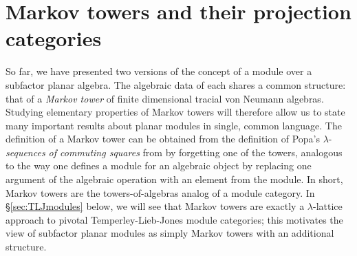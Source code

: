 \documentclass[11pt]{article}
\theoremstyle{plain}
\theoremstyle{definition}
\begin{document}
\section{Markov towers and their projection categories} 
\label{sec:MarkovTowers}

So far, we have presented two versions of the concept of a module over a subfactor planar algebra. The algebraic data of each shares a common structure: that of a \emph{Markov tower} of finite dimensional tracial von Neumann algebras. Studying elementary properties of Markov towers will therefore allow us to state many important results about planar modules in single, common language.  
The definition of a Markov tower can be obtained from the definition of Popa's $\lambda$-\emph{sequences of commuting squares} from \cite{MR1334479} by forgetting one of the towers,
analogous to the way one defines a module for an algebraic object by replacing one argument of the algebraic operation with an element from the module. In short, Markov towers are the towers-of-algebras analog of a module category. 
In \S\ref{sec:TLJmodules} below, we will see that Markov towers are exactly a $\lambda$-lattice approach to pivotal Temperley-Lieb-Jones module categories; this motivates the view of subfactor planar modules as simply Markov towers with an additional structure. 

\end{document}

